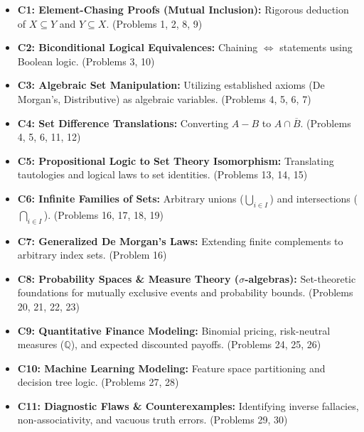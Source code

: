 \documentclass[12pt]{article}
\theoremstyle{definition}
\begin{document}
\begin{itemize}
    \item \textbf{C1: Element-Chasing Proofs (Mutual Inclusion):} Rigorous deduction of $X \subseteq Y$ and $Y \subseteq X$. (Problems 1, 2, 8, 9)
    \item \textbf{C2: Biconditional Logical Equivalences:} Chaining $\iff$ statements using Boolean logic. (Problems 3, 10)
    \item \textbf{C3: Algebraic Set Manipulation:} Utilizing established axioms (De Morgan's, Distributive) as algebraic variables. (Problems 4, 5, 6, 7)
    \item \textbf{C4: Set Difference Translations:} Converting $A - B$ to $A \cap \overline{B}$. (Problems 4, 5, 6, 11, 12)
    \item \textbf{C5: Propositional Logic to Set Theory Isomorphism:} Translating tautologies and logical laws to set identities. (Problems 13, 14, 15)
    \item \textbf{C6: Infinite Families of Sets:} Arbitrary unions ($\bigcup_{i \in I}$) and intersections ($\bigcap_{i \in I}$). (Problems 16, 17, 18, 19)
    \item \textbf{C7: Generalized De Morgan's Laws:} Extending finite complements to arbitrary index sets. (Problem 16)
    \item \textbf{C8: Probability Spaces \& Measure Theory ($\sigma$-algebras):} Set-theoretic foundations for mutually exclusive events and probability bounds. (Problems 20, 21, 22, 23)
    \item \textbf{C9: Quantitative Finance Modeling:} Binomial pricing, risk-neutral measures ($\mathbb{Q}$), and expected discounted payoffs. (Problems 24, 25, 26)
    \item \textbf{C10: Machine Learning Modeling:} Feature space partitioning and decision tree logic. (Problems 27, 28)
    \item \textbf{C11: Diagnostic Flaws \& Counterexamples:} Identifying inverse fallacies, non-associativity, and vacuous truth errors. (Problems 29, 30)
\end{itemize}
\end{document}
